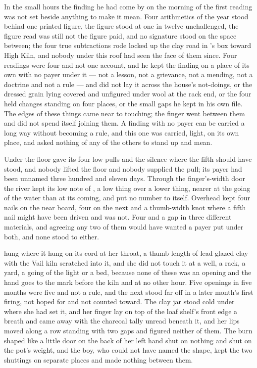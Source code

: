 \scenebreak

In the small hours the finding he had come by on the morning of the first reading was not set beside anything to make it mean. Four arithmetics of the year stood behind one printed figure, the figure stood at one in twelve unchallenged, the figure read was still not the figure paid, and no signature stood on the space between; the four true subtractions rode locked up the clay road in 's box toward High Kiln, and nobody under this roof had seen the face of them since. Four readings were four and not one account, and he kept the finding on a place of its own with no payer under it --- not a lesson, not a grievance, not a mending, not a doctrine and not a rule --- and did not lay it across the house's not-doings, or the dressed grain lying covered and unfigured under wool at the rack end, or the four held changes standing on four places, or the small gaps he kept in his own file. The edges of these things came near to touching; the finger went between them and did not spend itself joining them. A finding with no payer can be carried a long way without becoming a rule, and this one was carried, light, on its own place, and asked nothing of any of the others to stand up and mean.

Under the floor  gave its four low pulls and the silence where the fifth should have stood, and nobody lifted the floor and nobody supplied the pull; its payer had been unnamed three hundred and eleven days. Through the finger's-width door the river kept its low note of , a low thing over a lower thing, nearer at the going of the water than at its coming, and put no number to itself. Overhead  kept four nails on the near board, four on the next and a thumb-width knot where a fifth nail might have been driven and was not. Four and a gap in three different materials, and agreeing any two of them would have wanted a payer put under both, and none stood to either.

 hung where it hung on its cord at her throat, a thumb-length of lead-glazed clay with the Vail kiln scratched into it, and she did not touch it at a well, a rack, a yard, a going of the light or a bed, because none of these was an opening and the hand goes to the mark before the kiln and at no other hour. Five openings in five months were five and not a rule, and the next stood far off in a later month's first firing, not hoped for and not counted toward. The clay jar stood cold under  where she had set it, and her finger lay on top of the loaf shelf's front edge a breath and came away with the charcoal tally unread beneath it, and her lips moved along a row standing with two gaps and figured neither of them. The burn shaped like a little door on the back of her left hand shut on nothing and shut on the pot's weight, and the boy, who could not have named the shape, kept the two shuttings on separate places and made nothing between them.

